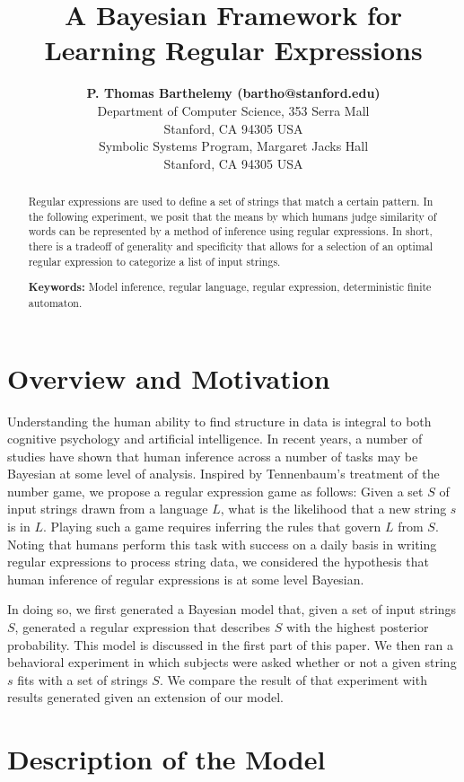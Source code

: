 \documentclass[10pt,letterpaper]{article}
\title{A Bayesian Framework for Learning Regular Expressions}
\author{{\large \bf{P. Thomas Barthelemy} (bartho@stanford.edu)} \\
  Department of Computer Science, 353 Serra Mall \\
  Stanford, CA 94305 USA
  \AND {\large \bf Nicholas Borg (nickborg@stanford.edu)} \\
  Symbolic Systems Program, Margaret Jacks Hall \\
  Stanford, CA 94305 USA}
\begin{document}
\maketitle


\begin{abstract}
Regular expressions are used to define a set of strings that match a certain pattern. In the following experiment, we posit that the means by which humans judge similarity of words can be represented by a method of inference using regular expressions. In short, there is a tradeoff of generality and specificity that allows for a selection of an optimal regular expression to categorize a list of input strings.

\textbf{Keywords:} 
Model inference, regular language, regular expression, deterministic finite automaton.
\end{abstract}


\section{Overview and Motivation}
Understanding the human ability to find structure in data is integral to both cognitive psychology and artificial intelligence. In recent years, a number of studies have shown that human inference across a number of tasks may be Bayesian at some level of analysis. 
Inspired by Tennenbaum's treatment of the number game, we propose a regular expression game as follows: Given a set $S$ of input strings drawn from a language $L$, what is the likelihood that a new string $s$ is in $L$. Playing such a game requires inferring the rules that govern $L$ from $S$. Noting that humans perform this task  with success on a daily basis in writing regular expressions to process string data, we considered the hypothesis that human inference of regular expressions is at some level Bayesian. 

In doing so, we first generated a Bayesian model that, given a set of input strings $S$, generated a regular expression that describes $S$ with the highest posterior probability. This model is discussed in the first part of this paper. We then ran a behavioral experiment in which subjects were asked whether or not a given string $s$ fits with a set of strings $S$. We compare the result of that experiment with results generated given an extension of our model.  

\section{Description of the Model}
\end{document}
